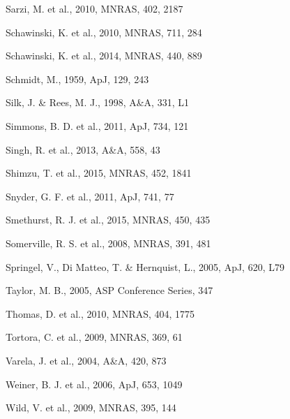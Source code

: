 \documentclass[useAMS,usenatbib]{mn2e}
\begin{document}
\begin{thebibliography}{}
 Sarzi, M. et al., 2010, MNRAS, 402, 2187

 Schawinski, K. et al., 2010, MNRAS, 711, 284

 Schawinski, K. et al., 2014, MNRAS, 440, 889

 Schmidt, M., 1959, ApJ, 129, 243

 Silk, J. \& Rees, M. J., 1998, A\&A, 331, L1

 Simmons, B. D. et al., 2011, ApJ, 734, 121

 Singh, R. et al., 2013, A\&A, 558, 43

 Shimzu, T. et al., 2015, MNRAS, 452, 1841


 Snyder, G. F. et al., 2011, ApJ, 741, 77

 Smethurst, R. J. et al., 2015, MNRAS, 450, 435

 Somerville, R. S. et al., 2008, MNRAS, 391, 481

 Springel, V., Di Matteo, T. \& Hernquist, L., 2005, ApJ, 620, L79

 Taylor, M. B., 2005, ASP Conference Series, 347

 Thomas, D. et al., 2010, MNRAS, 404, 1775

 Tortora, C. et al., 2009, MNRAS, 369, 61

 Varela, J. et al., 2004, A\&A, 420, 873

 Weiner, B. J. et al., 2006, ApJ, 653, 1049

 Wild, V. et al., 2009, MNRAS, 395, 144


\end{thebibliography}
\end{document}
